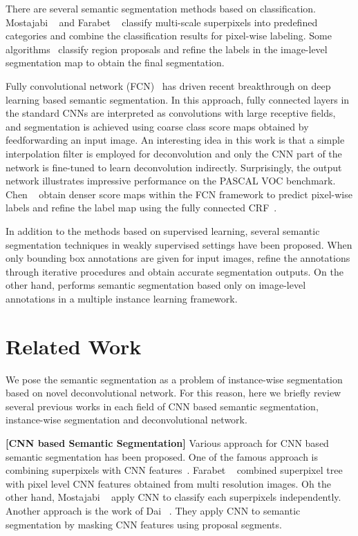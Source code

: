 \documentclass[10pt,twocolumn,letterpaper]{article}
\begin{document}
There are several semantic segmentation methods based on classification.
Mostajabi \etal~\cite{Zoomout} and Farabet \etal~\cite{Farabet} classify multi-scale superpixels into predefined categories and combine the classification results for pixel-wise labeling.
Some algorithms~\cite{DAICVPR15,Sds, Hypercolumns} classify region proposals and refine the labels in the image-level segmentation map to obtain the final segmentation.

Fully convolutional network (FCN)~\cite{Fcn} has driven recent breakthrough on deep learning based semantic segmentation.
In this approach, fully connected layers in the standard CNNs are interpreted as convolutions with large receptive fields, and segmentation is achieved using coarse class score maps obtained by feedforwarding an input image.
An interesting idea in this work is that a simple interpolation filter is employed for deconvolution and only the CNN part of the network is fine-tuned to learn deconvolution indirectly.
Surprisingly, the output network illustrates impressive performance on the PASCAL VOC benchmark.
Chen \etal~\cite{Deeplabcrf} obtain denser score maps within the FCN framework to predict pixel-wise labels and refine the label map using the fully connected CRF~\cite{Fullycrf}.

In addition to the methods based on supervised learning, several semantic segmentation techniques in weakly supervised settings have been proposed.
When only bounding box annotations are given for input images, \cite{Boxsup,Weaklyandsemi} refine the annotations through iterative procedures and obtain accurate segmentation outputs. On the other hand, \cite{PinheiroArxiv2015} performs semantic segmentation based only on image-level annotations in a multiple instance learning framework.

\iffalse
\section{Related Work}
\label{sec:related}
We pose the semantic segmentation as a problem of instance-wise segmentation based on novel deconvolutional network. 
For this reason, here we briefly review several previous works in each field of CNN based semantic segmentation, instance-wise segmentation and deconvolutional network.


{\bf[CNN based Semantic Segmentation]}
Various approach for CNN based semantic segmentation has been proposed.
One of the famous approach is combining superpixels with CNN features~\cite{Farabet, Zoomout}.
Farabet \etal~\cite{Farabet} combined superpixel tree with pixel level CNN features obtained from multi resolution images.
Oh the other hand, Mostajabi \etal~\cite{Zoomout} apply CNN to classify each superpixels independently. 
Another approach is the work of Dai \etal~\cite{DAICVPR15}.
They apply CNN to semantic segmentation by masking CNN features using proposal segments.
\end{document}
